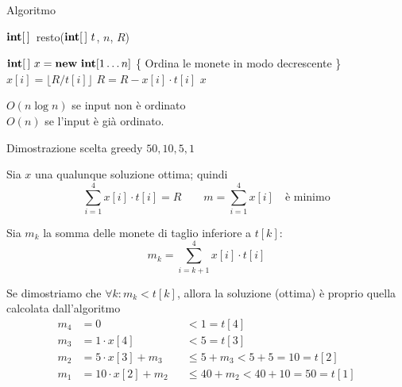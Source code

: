 \begin{frame}{Algoritmo}
	
\vspace{-12pt}
\begin{Procedure}
\caption[A]{$\INTARRAY$\ \textsf{resto}($\INTARRAY\ t$, \INTEGER $n$, \INTEGER $R$)}
$\INTARRAY\ x = \NEW\ \INTEGER[1 \ldots n]$\;
\{ Ordina le monete in modo decrescente \}\;
 {
  $x[i] = \lfloor R/t[i] \rfloor$\;
  $R = R - x[i] \cdot t[i]$\;
}
\Return $x$\;
\end{Procedure}
	
 $O(n \log n)$ se input non è ordinato\\
\makebox[2.5cm][l]{} $O(n)$ se l'input è già ordinato.

\end{frame}

\begin{frame}{Dimostrazione scelta greedy $50,10,5,1$}

\vspace{-9pt}
\BIL
\item Sia $x$ una qualunque soluzione ottima; quindi
\[
	\sum_{i=1}^4 x[i] \cdot t[i] = R \qquad m = \sum_{i=1}^4 x[i] \quad \textrm{è minimo}
\]

\item Sia $m_k$ la somma delle monete di taglio inferiore a $t[k]$:
\[
  m_k = \sum_{i=k+1}^4 x[i] \cdot  t[i]
\]

\item 
Se dimostriamo che $\forall k: m_k < t[k]$, allora la soluzione (ottima)
è proprio quella calcolata dall'algoritmo\\[-6pt]
\begin{align*}
m_4 &= 0 &&< 1 = t[4] \\
m_3 &= 1 \cdot x[4] && < 5 = t[3] \\
m_2 &= 5 \cdot x[3] + m_3 &&\leq 5 + m_3 < 5 + 5 = 10 = t[2] \\
m_1 &= 10 \cdot x[2] + m_2 && \leq 40 + m_2 < 40 + 10 = 50 = t[1] \\
\end{align*}
\EIL

\end{frame}

